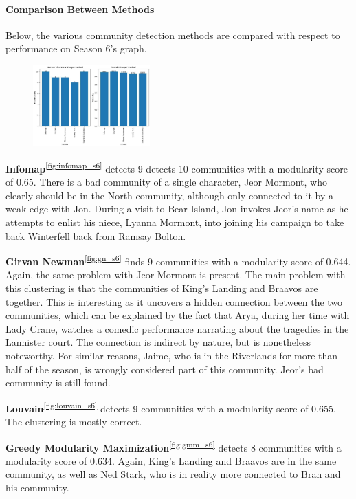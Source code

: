 \documentclass[10pt,twocolumn,letterpaper]{article}
\begin{document}
\paragraph{Comparison Between Methods}

Below, the various community detection methods are compared with respect to performance on Season 6's graph.

\begin{figure}[!h]
    \centering
    \includegraphics[width=0.4\textwidth]{img/s6/communities_comparison.jpg}
\end{figure}

\textbf{Infomap}\textsuperscript{\ref{fig:infomap_s6}} detects 9 detects 10 communities with a modularity score of 0.65. There is a bad community of a single character, Jeor Mormont, who clearly should be in the North community, although only connected to it by a weak edge with Jon. During a visit to Bear Island, Jon invokes Jeor's name as he attempts to enlist his niece, Lyanna Mormont, into joining his campaign to take back Winterfell back from Ramsay Bolton. 

\textbf{Girvan Newman}\textsuperscript{\ref{fig:gn_s6}} finds 9 communities with a modularity score of 0.644. Again, the same problem with Jeor Mormont is present. The main problem with this clustering is that the communities of King's Landing and Braavos are together. This is interesting as it uncovers a hidden connection between the two communities, which can be explained by the fact that Arya, during her time with Lady Crane, watches a comedic performance narrating about the tragedies in the Lannister court. The connection is indirect by nature, but is nonetheless noteworthy. For similar reasons, Jaime, who is in the Riverlands for more than half of the season, is wrongly considered part of this community. Jeor's bad community is still found.

\textbf{Louvain}\textsuperscript{\ref{fig:louvain_s6}} detects 9 communities with a modularity score of 0.655. The clustering is mostly correct.

\textbf{Greedy Modularity Maximization}\textsuperscript{\ref{fig:gmm_s6}} detects 8 communities with a modularity score of 0.634. Again, King's Landing and Braavos are in the same community, as well as Ned Stark, who is in reality more connected to Bran and his community.
\end{document}
